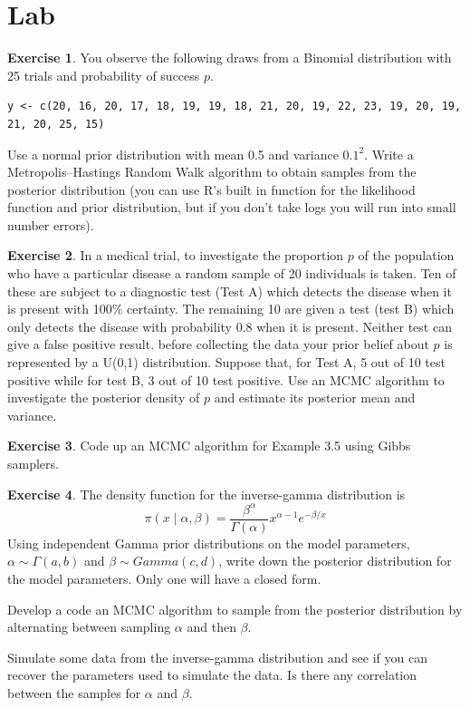 \documentclass[
]{book}
\theoremstyle{definition}
\theoremstyle{definition}
\theoremstyle{definition}
\newtheorem{exercise}{Exercise}[chapter]
\theoremstyle{definition}
\theoremstyle{remark}
\begin{document}
\section{Lab}\label{lab-2}

\begin{exercise}
You observe the following draws from a Binomial distribution with 25 trials and probability of success \(p\).

\begin{verbatim}
y <- c(20, 16, 20, 17, 18, 19, 19, 18, 21, 20, 19, 22, 23, 19, 20, 19, 21, 20, 25, 15)
\end{verbatim}

Use a normal prior distribution with mean 0.5 and variance \(0.1^2\). Write a Metropolis--Hastings Random Walk algorithm to obtain samples from the posterior distribution (you can use R's built in function for the likelihood function and prior distribution, but if you don't take logs you will run into small number errors).
\end{exercise}

\begin{exercise}
In a medical trial, to investigate the proportion \(p\) of the population who have a particular disease a random sample of 20 individuals is taken. Ten of these are subject to a diagnostic test (Test A) which detects the disease when it is present with 100\% certainty. The remaining 10 are given a test (test B) which only detects the disease with probability 0.8 when it is present. Neither test can give a false positive result. before collecting the data your prior belief about \(p\) is represented by a U(0,1) distribution. Suppose that, for Test A, 5 out of 10 test positive while for test B, 3 out of 10 test positive. Use an MCMC algorithm to investigate the posterior density of \(p\) and estimate its posterior mean and variance.
\end{exercise}

\begin{exercise}
Code up an MCMC algorithm for Example 3.5 using Gibbs samplers.
\end{exercise}

\begin{exercise}
The density function for the inverse-gamma distribution is
\[
\pi(x\mid \alpha, \beta) = \frac{\beta^\alpha}{\Gamma(\alpha)}x^{\alpha - 1}e^{-\beta/x}
\]
Using independent Gamma prior distributions on the model parameters, \(\alpha \sim \Gamma(a, b)\) and \(\beta \sim Gamma(c, d)\), write down the posterior distribution for the model parameters. Only one will have a closed form.

Develop a code an MCMC algorithm to sample from the posterior distribution by alternating between sampling \(\alpha\) and then \(\beta\).

Simulate some data from the inverse-gamma distribution and see if you can recover the parameters used to simulate the data. Is there any correlation between the samples for \(\alpha\) and \(\beta\).
\end{exercise}
\end{document}
